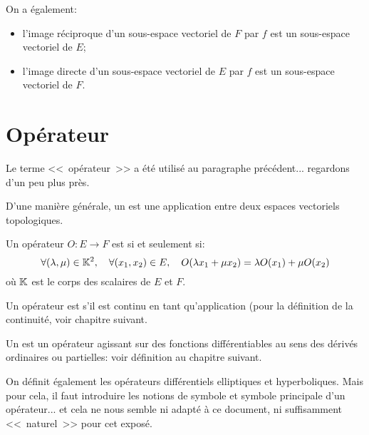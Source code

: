 On a également:
\begin{itemize}
   \item l'image réciproque d'un sous-espace vectoriel de $F$ par $f$ est un sous-espace vectoriel de $E$;
   \item l'image directe d'un sous-espace vectoriel de $E$ par $f$ est un sous-espace vectoriel de $F$.
\end{itemize}

\medskip
\section{Opérateur}

Le terme <<~opérateur~>> a été utilisé au paragraphe précédent... regardons d'un peu
plus près.

\medskip
D'une manière générale, un  est une application entre
deux espaces vectoriels topologiques.

\medskip
Un opérateur $O : E \to F$ est  si et seulement si:
\begin{equation}\forall (\lambda, \mu) \in \mathbb K^2,\quad\forall (x_1, x_2) \in E,\quad O( \lambda x_1 + \mu x_2)=\lambda O(x_1) + \mu O(x_2)
\end{equation}
où $\mathbb K$ est le corps des scalaires de $E$ et $F$.

\medskip
{}

\medskip
Un opérateur est  s'il est continu en tant qu'application (pour la définition de la
continuité, voir chapitre suivant.


\medskip
Un  est un opérateur agissant sur des
fonctions différentiables au sens des dérivés ordinaires ou partielles: voir définition
au chapitre suivant.

\medskip
On définit également les opérateurs différentiels elliptiques et hyperboliques.
Mais pour cela, il faut introduire les notions de symbole et symbole principale d'un
opérateur... et cela ne nous semble ni adapté à ce document, ni suffisamment
<<~naturel~>> pour cet exposé.




